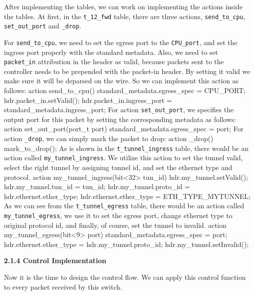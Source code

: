 \documentclass{article}%
\newenvironment{code}%
   {\snugshade\verbatim}%
   {\endverbatim\endsnugshade}
\begin{document}
\begin{Large}
After implementing the tables, we can work on implementing the actions inside the tables. At first, in the \texttt{t\_12\_fwd} table, there are three actions, \texttt{send\_to\_cpu}, \texttt{set\_out\_port} and \texttt{\_drop}.

For \texttt{send\_to\_cpu}, we need to set the egress port to the \texttt{CPU\_port}, and set the ingress port properly with the standard metadata. Also, we need to set \texttt{packet\_in} attribution in the header as valid, because packets sent to the controller needs to be prepended with the packet-in header. By setting it valid we make sure it will be deparsed on the wire. So we can implement this action as follows:
\begin{code}
    action send_to_cpu() {
        standard_metadata.egress_spec = CPU_PORT;
        hdr.packet_in.setValid();
        hdr.packet_in.ingress_port = standard_metadata.ingress_port;
    }
\end{code}
For action \texttt{set\_out\_port}, we specifies the output port for this packet by setting the corresponding metadata as follows:
\begin{code}
    action set_out_port(port_t port) {
        standard_metadata.egress_spec = port;
    }
\end{code}
\newpage
For action \texttt{\_drop}, we can simply mark the packet to drop:
\begin{code}
    action _drop() {
        mark_to_drop();
    }
\end{code}
As is shown in the \texttt{t\_tunnel\_ingress} table, there would be an action called \texttt{my\_tunnel\_ingress}. We utilize this action to set the tunnel valid, select the right tunnel by assigning tunnel id, and set the ethernet type and protocol.
\begin{code}
     action my_tunnel_ingress(bit<32> tun_id) {
        hdr.my_tunnel.setValid();
        hdr.my_tunnel.tun_id = tun_id;
        hdr.my_tunnel.proto_id = hdr.ethernet.ether_type;
        hdr.ethernet.ether_type = ETH_TYPE_MYTUNNEL;
    }
\end{code}
As we can see from the \texttt{t\_tunnel\_egress} table, there would be an action called \texttt{my\_tunnel\_egress}, we use it to set the egress port, change ethernet type to original protocol id, and finally, of course, set the tunnel to invalid.
\begin{code}
    action my_tunnel_egress(bit<9> port) {
        standard_metadata.egress_spec = port;
        hdr.ethernet.ether_type = hdr.my_tunnel.proto_id;
        hdr.my_tunnel.setInvalid();
    }
\end{code}
\begin{flushleft}
\begin{Large}
\textbf{2.1.4 Control Implementation}
\end{Large}
\end{flushleft}
Now it is the time to design the control flow. We can apply this control function to every packet received by this switch.


\end{Large}
\end{document}
